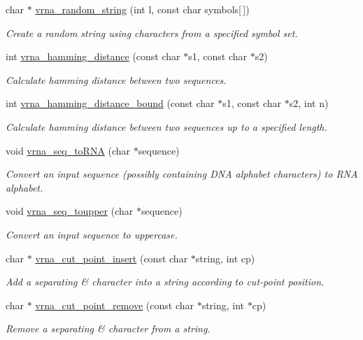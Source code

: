\begin{DoxyCompactItemize}
char $\ast$ \hyperlink{group__string__utils_ga4eeb3750dcf860b9f3158249f95dbd7f}{vrna\+\_\+random\+\_\+string} (int l, const char symbols\mbox{[}$\,$\mbox{]})
\begin{DoxyCompactList}\small\item\em Create a random string using characters from a specified symbol set. \end{DoxyCompactList}\item 
int \hyperlink{group__string__utils_ga301798b43b6f66687985c725efd14f32}{vrna\+\_\+hamming\+\_\+distance} (const char $\ast$s1, const char $\ast$s2)
\begin{DoxyCompactList}\small\item\em Calculate hamming distance between two sequences. \end{DoxyCompactList}\item 
int \hyperlink{group__string__utils_ga5d1c2271e79d9bcb52d4e68360763fb9}{vrna\+\_\+hamming\+\_\+distance\+\_\+bound} (const char $\ast$s1, const char $\ast$s2, int n)
\begin{DoxyCompactList}\small\item\em Calculate hamming distance between two sequences up to a specified length. \end{DoxyCompactList}\item 
void \hyperlink{group__string__utils_gacfed92cba77064f6c743f9118d079bfc}{vrna\+\_\+seq\+\_\+to\+R\+NA} (char $\ast$sequence)
\begin{DoxyCompactList}\small\item\em Convert an input sequence (possibly containing D\+NA alphabet characters) to R\+NA alphabet. \end{DoxyCompactList}\item 
void \hyperlink{group__string__utils_ga4f44dca03c9d708d68e64c0610bb9091}{vrna\+\_\+seq\+\_\+toupper} (char $\ast$sequence)
\begin{DoxyCompactList}\small\item\em Convert an input sequence to uppercase. \end{DoxyCompactList}\item 
char $\ast$ \hyperlink{group__string__utils_ga74f05ece32ea73b59f84a7452afd5fae}{vrna\+\_\+cut\+\_\+point\+\_\+insert} (const char $\ast$string, int cp)
\begin{DoxyCompactList}\small\item\em Add a separating \textquotesingle{}\&\textquotesingle{} character into a string according to cut-\/point position. \end{DoxyCompactList}\item 
char $\ast$ \hyperlink{group__string__utils_ga1fbd821d4408cc5f1dd9d12c15e092cb}{vrna\+\_\+cut\+\_\+point\+\_\+remove} (const char $\ast$string, int $\ast$cp)
\begin{DoxyCompactList}\small\item\em Remove a separating \textquotesingle{}\&\textquotesingle{} character from a string. \end{DoxyCompactList}\end{DoxyCompactItemize}


